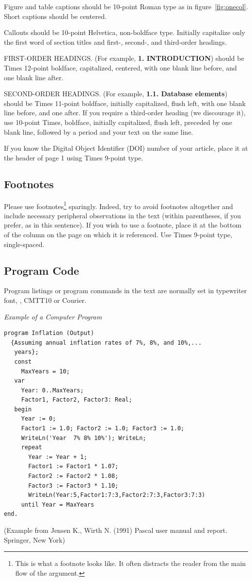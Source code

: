 {Figure and table captions should be 10-point Roman type as in figure~\ref{fig:onecol}.  Short captions should be centered. 

Callouts should be 10-point Helvetica, non-boldface type.
Initially capitalize only the first word of section titles and first-,
second-, and third-order headings.

FIRST-ORDER HEADINGS. (For example, {\large \bf 1. INTRODUCTION}) should be Times 12-point boldface, capitalized, centered, with one blank line before, and one blank line after.

SECOND-ORDER HEADINGS. (For example, { \bf 1.1. Database elements}) should be Times 11-point boldface, initially capitalized, flush left, with one blank line before, and one after. If you require a third-order heading (we discourage it), use 10-point Times, boldface, initially capitalized, flush left, preceded by one blank line, followed by a period and your text on the same line.

If you know the Digital Object Identifier (DOI) number of your article, place it at the header of page 1 using Times 9-point type.

\subsection{Footnotes}

Please use footnotes\footnote{This is what a footnote looks like.  It often distracts the reader from the main flow of the argument.} sparingly. Indeed, try to avoid footnotes altogether and include necessary peripheral observations in the text (within parentheses, if you prefer, as in this sentence).  If you wish to use a footnote, place it at the bottom of the column on the page on which it is referenced. Use Times 9-point type, single-spaced.

\subsection{Program Code}

Program listings or program commands in the text are normally set in typewriter font, \eg, CMTT10 or Courier.

\noindent
{\it Example of a Computer Program}
\begin{verbatim}
program Inflation (Output)
  {Assuming annual inflation rates of 7%, 8%, and 10%,...
   years};
   const
     MaxYears = 10;
   var
     Year: 0..MaxYears;
     Factor1, Factor2, Factor3: Real;
   begin
     Year := 0;
     Factor1 := 1.0; Factor2 := 1.0; Factor3 := 1.0;
     WriteLn('Year  7% 8% 10%'); WriteLn;
     repeat
       Year := Year + 1;
       Factor1 := Factor1 * 1.07;
       Factor2 := Factor2 * 1.08;
       Factor3 := Factor3 * 1.10;
       WriteLn(Year:5,Factor1:7:3,Factor2:7:3,Factor3:7:3)
     until Year = MaxYears
end.
\end{verbatim}
%
\noindent
{\small (Example from Jensen K., Wirth N. (1991) Pascal user manual and
report. Springer, New York)}

}
